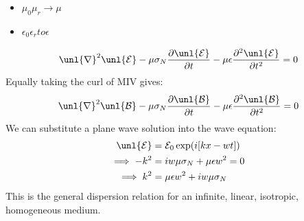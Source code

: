 \documentclass[a4paper, 11pt, normalem]{report}
\newcommand\p{\partial}
\newcommand\E{\mathcal{E}}
\newcommand\uE{\unl{\E}}
\newcommand\B{\mathcal{B}}
\newcommand\uB{\unl{\B}}
\newcommand\del{\unl{\nabla}}
\newcommand\eno{\epsilon_0}
\newcommand\er{\epsilon_r}
\newcommand\e{\epsilon}
\begin{document}
\chapter{}

\begin{itemize}
    \item $\mu_0\mu_r \to \mu$
    \item $\eno\er to \e$
\end{itemize}
\begin{equation*}
    \del^2\uE - \mu\sigma_N\frac{\p \uE}{\p t} - \mu\e\frac{\p^2\uE}{\p t^2} = 0
\end{equation*}
Equally taking the curl of M\RN{4} gives:
\begin{equation*}
    \del^2\uB - \mu\sigma_N \frac{\p \uB}{\p t} - \mu\e\frac{\p^2\uB}{\p t^2} = 0
\end{equation*}
We can substitute a plane wave solution into the wave equation:
\begin{align*}
    \uE &= \E_0 \exp(i[kx - wt]) \\
    \implies -k^2 &= iw\mu\sigma_N + \mu\e w^2 = 0 \\
    \implies k^2 &= \mu\e w^2 + iw\mu\sigma_N
\end{align*}
This is the general dispersion relation for an infinite, linear, isotropic, homogeneous medium.
\end{document}
